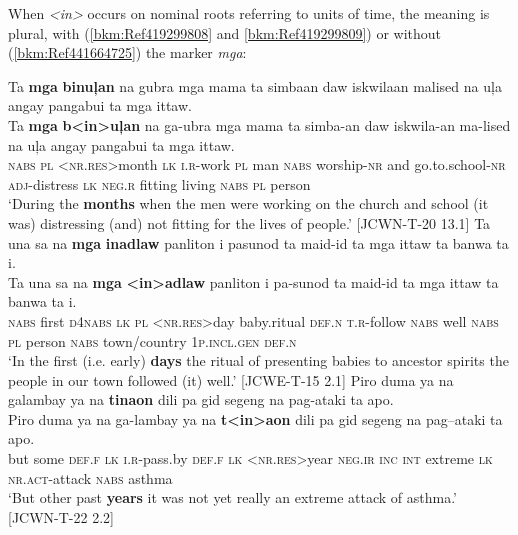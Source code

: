 When \textit{<in>} occurs on nominal roots referring to units of time, the meaning is plural, with (\ref{bkm:Ref419299808} and \ref{bkm:Ref419299809}) or without (\ref{bkm:Ref441664725}) the  marker \textit{mga}:

\ea
\label{bkm:Ref419299808}
Ta  \textbf{mga}  \textbf{binuļan}  na  gubra  mga  mama  ta  simbaan  daw  iskwilaan  malised  na  uļa  angay  pangabui  ta  mga  ittaw. \\\smallskip
 \gll Ta  \textbf{mga}  \textbf{b<in>uļan}  na  ga-ubra  mga  mama  ta  simba-an  daw  iskwila-an  ma-lised  na  uļa  angay  pangabui  ta  mga  ittaw. \\
\textsc{nabs} \textsc{pl}  <\textsc{nr.res}>month  \textsc{lk}  \textsc{i.r-}work  \textsc{pl}  man  \textsc{nabs}  worship-\textsc{nr}  and go.to.school-\textsc{nr}  \textsc{adj-}distress  \textsc{lk}  \textsc{neg.r}  fitting  living  \textsc{nabs}  \textsc{pl}  person \\
\glt ‘During the \textbf{months} when the men were working on the church and school (it was) distressing (and) not fitting for the lives of people.' [JCWN-T-20 13.1]
\z
\ea
\label{bkm:Ref419299809}
Ta  una  sa  na  \textbf{mga}  \textbf{inadlaw}  panliton  i  pasunod ta  maid-id  ta  mga  ittaw  ta  banwa  ta  i. \\\smallskip
 \gll Ta  una  sa  na  \textbf{mga}  \textbf{<in>adlaw}  panliton  i  pa-sunod ta  maid-id  ta  mga  ittaw  ta  banwa  ta  i. \\
\textsc{nabs}  first  \textsc{d}4\textsc{nabs}  \textsc{lk}  \textsc{pl}  \textsc{<}\textsc{nr.res}>day  baby.ritual  \textsc{def.n}  \textsc{t.r}-follow \textsc{nabs}  well  \textsc{nabs}  \textsc{pl}  person  \textsc{nabs}  town/country  1\textsc{p.incl.gen}  \textsc{def.n} \\
\glt `In the first (i.e. early) \textbf{days} the ritual of presenting babies to ancestor spirits the people in our town followed (it) well.’ [JCWE-T-15 2.1]
\z
\ea
\label{bkm:Ref441664725}
Piro  duma  ya  na  galambay  ya  na  \textbf{tinaon}  dili  pa  gid  segeng  na  pag-ataki  ta  apo. \\\smallskip
 \gll Piro  duma  ya  na  ga-lambay  ya  na  \textbf{t<in>aon}  dili  pa  gid  segeng  na  pag--ataki  ta  apo. \\
but  some  \textsc{def.f}  \textsc{lk}  \textsc{i.r}-pass.by  \textsc{def.f}  \textsc{lk}  \textsc{<}\textsc{nr.res}>year  \textsc{neg.ir}  \textsc{inc}  \textsc{int}  extreme  \textsc{lk}  \textsc{nr.act}-attack  \textsc{nabs}  asthma \\
\glt `But other past \textbf{years} it was not yet really an extreme attack of asthma.’ [JCWN-T-22 2.2]
\z

